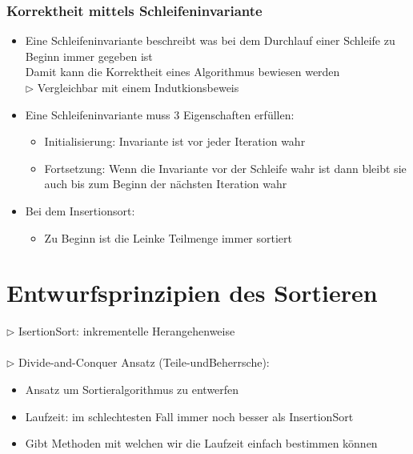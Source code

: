 	\subsubsection{Korrektheit mittels Schleifeninvariante}
	\begin{itemize}
		\item Eine Schleifeninvariante beschreibt was bei dem Durchlauf einer Schleife zu Beginn immer gegeben ist \\
			Damit kann die Korrektheit eines Algorithmus bewiesen werden \\
			$\rhd$ Vergleichbar mit einem Indutkionsbeweis 
		\item Eine Schleifeninvariante muss 3 Eigenschaften erfüllen:
		\begin{itemize}
			\item Initialisierung: Invariante ist vor jeder Iteration wahr
			\item Fortsetzung: Wenn die Invariante vor der Schleife wahr ist dann bleibt sie auch bis zum Beginn der nächsten Iteration wahr
		\end{itemize}
		\item Bei dem Insertionsort:
		\begin{itemize}
			\item Zu Beginn ist die Leinke Teilmenge immer sortiert
		\end{itemize}
	\end{itemize}



\vspace{1.5cm}
\section{Entwurfsprinzipien des Sortieren} %

	$\rhd$ IsertionSort: inkrementelle Herangehenweise \\ \\

	\noindent $\rhd$ Divide-and-Conquer Ansatz (Teile-undBeherrsche):
	\begin{itemize}
		\item Ansatz um Sortieralgorithmus zu entwerfen
		\item Laufzeit: im schlechtesten Fall immer noch besser als InsertionSort
		\item Gibt Methoden mit welchen wir die Laufzeit einfach bestimmen können \\
	\end{itemize}

